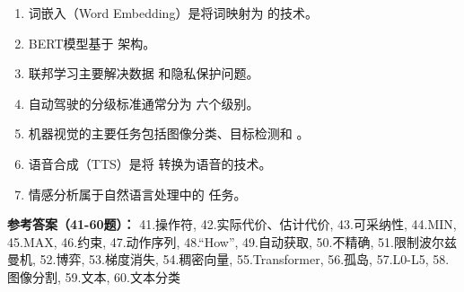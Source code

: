 \begin{enumerate}[resume,leftmargin=2em,itemsep=1pt]
\item 词嵌入（Word Embedding）是将词映射为 \underline{\hspace{3em}} 的技术。
\item BERT模型基于 \underline{\hspace{3em}} 架构。
\item 联邦学习主要解决数据 \underline{\hspace{3em}} 和隐私保护问题。
\item 自动驾驶的分级标准通常分为 \underline{\hspace{3em}} 六个级别。
\item 机器视觉的主要任务包括图像分类、目标检测和 \underline{\hspace{3em}}。
\item 语音合成（TTS）是将 \underline{\hspace{3em}} 转换为语音的技术。
\item 情感分析属于自然语言处理中的 \underline{\hspace{3em}} 任务。
\end{enumerate}

\textbf{参考答案（41-60题）：}
41.操作符, 42.实际代价、估计代价, 43.可采纳性, 44.MIN, 45.MAX, 46.约束, 47.动作序列, 48.“How”, 49.自动获取, 50.不精确, 
51.限制波尔兹曼机, 52.博弈, 53.梯度消失, 54.稠密向量, 55.Transformer, 56.孤岛, 57.L0-L5, 58.图像分割, 59.文本, 60.文本分类

